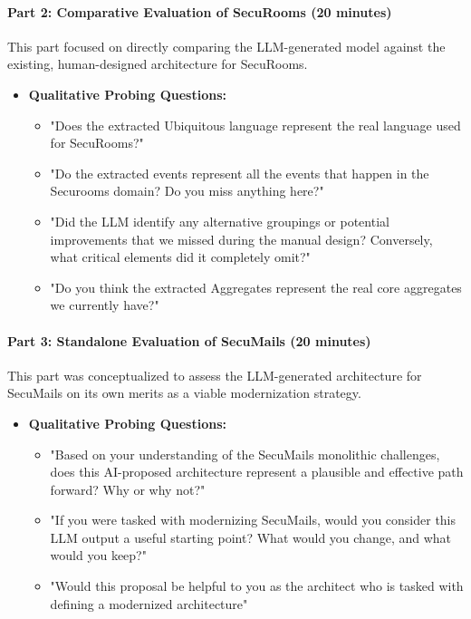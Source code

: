 \paragraph{Part 2: Comparative Evaluation of SecuRooms (20 minutes)}
This part focused on directly comparing the LLM-generated model against the existing, human-designed architecture for SecuRooms.

\begin{itemize}
    \item \textbf{Qualitative Probing Questions:}
    \begin{itemize}
        \item "Does the extracted Ubiquitous language represent the real language used for SecuRooms?"
        \item "Do the extracted events represent all the events that happen in the Securooms domain? Do you miss anything here?"
        \item "Did the LLM identify any alternative groupings or potential improvements that we missed during the manual design? Conversely, what critical elements did it completely omit?"
        \item "Do you think the extracted Aggregates represent the real core aggregates we currently have?"
    \end{itemize}
\end{itemize}

\paragraph{Part 3: Standalone Evaluation of SecuMails (20 minutes)}
This part was conceptualized to assess the LLM-generated architecture for SecuMails on its own merits as a viable modernization strategy.

\begin{itemize}
    \item \textbf{Qualitative Probing Questions:}
    \begin{itemize}
        \item "Based on your understanding of the SecuMails monolithic challenges, does this AI-proposed architecture represent a plausible and effective path forward? Why or why not?"
        \item "If you were tasked with modernizing SecuMails, would you consider this LLM output a useful starting point? What would you change, and what would you keep?"
        \item "Would this proposal be helpful to you as the architect who is tasked with defining a modernized architecture"
    \end{itemize}
\end{itemize}

